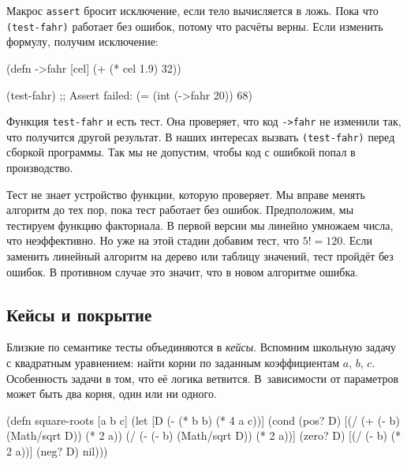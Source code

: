 Макрос \verb|assert| бросит исключение, если тело вычисляется в ложь. Пока что
\verb|(test-fahr)| работает без ошибок, потому что расчёты верны. Если изменить
формулу, получим исключение:

\begin{english}
  \begin{clojure}
(defn ->fahr [cel]
  (+ (* cel 1.9) 32))

(test-fahr)
;; Assert failed: (= (int (->fahr 20)) 68)
  \end{clojure}
\end{english}

Функция \verb|test-fahr| и есть тест. Она проверяет, что код \verb|->fahr|
не изменили так, что получится другой результат. В наших интересах вызвать
\verb|(test-fahr)| перед сборкой программы. Так мы не допустим, чтобы код с
ошибкой попал в производство.


Тест не знает устройство функции, которую проверяет. Мы вправе менять алгоритм
до тех пор, пока тест работает без ошибок. Предположим, мы тестируем функцию
факториала. В первой версии мы линейно умножаем числа, что неэффективно. Но уже
на этой стадии добавим тест, что $5! = 120$. Если заменить линейный алгоритм на
дерево или таблицу значений, тест пройдёт без ошибок. В противном случае это
значит, что в новом алгоритме ошибка.

\subsection{Кейсы и покрытие}


Близкие по семантике тесты объединяются в \emph{кейсы}. Вспомним школьную задачу
с квадратным уравнением: найти корни по заданным коэффициентам $a$, $b$,
$c$. Особенность задачи в том, что её логика ветвится. В~зависимости от
параметров может быть два корня, один или ни одного.


\begin{english}
  \begin{clojure}
(defn square-roots [a b c]
  (let [D (- (* b b) (* 4 a c))]
    (cond
      (pos? D) [(/ (+ (- b) (Math/sqrt D)) (* 2 a))
                (/ (- (- b) (Math/sqrt D)) (* 2 a))]
      (zero? D) [(/ (- b) (* 2 a))]
      (neg? D) nil)))
  \end{clojure}
\end{english}

